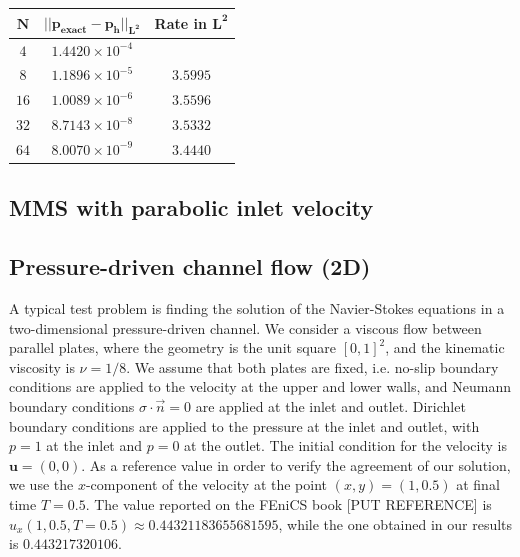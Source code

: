 \documentclass[11pt,a4paper,titlepage]{report}
\begin{document}
\begin{center}
\begin{tabular}{| c | c | c |}
\hline
$\mathbf{N}$ & $\mathbf{|| p_{exact} - p_h ||_{L^2}}$ & \textbf{Rate in } $  \mathbf{L^2}$  \\
\hline
$ 4 $ & $1.4420  \times 10^{-4} $ & \\
\hline
$ 8 $ & $ 1.1896  \times 10^{-5} $ & $3.5995$ \\
\hline
$ 16 $ & $ 1.0089  \times 10^{-6} $ & $3.5596$ \\
\hline
$ 32 $ & $  8.7143 \times 10^{-8} $ & $3.5332$ \\
\hline
$ 64 $ & $ 8.0070 \times 10^{-9} $ & $3.4440$ \\
\hline
\end{tabular}
\end{center}


\subsection{MMS with parabolic inlet velocity}

\subsection{Pressure-driven channel flow (2D)}


A typical test problem is finding the solution of the Navier-Stokes equations in a two-dimensional pressure-driven channel. We consider a viscous flow between parallel plates, where the geometry is the unit square $[0,1]^2$, and the kinematic viscosity is $\nu = 1/8$. We assume that both plates are fixed, i.e. no-slip boundary conditions are applied to the velocity at the upper and lower walls, and Neumann boundary conditions $\sigma \cdot \vec{n} = 0$ are applied at the inlet and outlet. Dirichlet boundary conditions are applied to the pressure at the inlet and outlet, with $p = 1$ at the inlet and $p = 0$ at the outlet. The initial condition for the velocity is $\mathbf{u} = (0,0)$. As a reference value in order to verify the agreement of our solution, we use the $x$-component of the velocity at the point $(x, y) = (1, 0.5)$ at final time $T = 0.5 $. The value reported on the FEniCS book [PUT REFERENCE] is $u_x(1, 0.5, T=0.5) \approx 0.44321183655681595$, while the one obtained in our results is $0.443217320106$.
\end{document}

